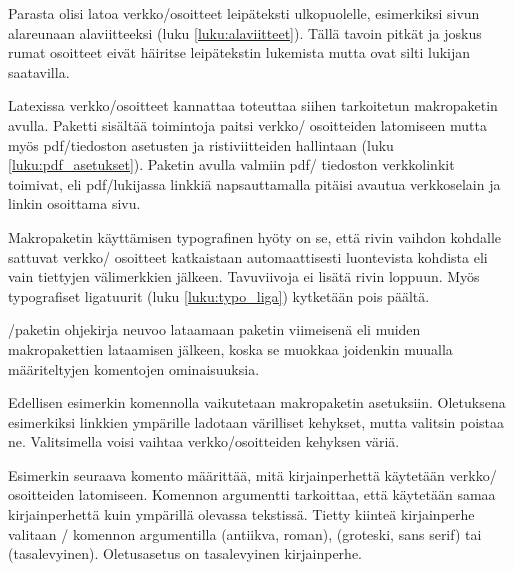 Parasta olisi latoa verkko\-/osoitteet leipäteksti ulkopuolelle,
esimerkiksi sivun alareunaan alaviitteeksi (luku
\ref{luku:alaviitteet}). Tällä tavoin pitkät ja joskus rumat osoitteet
eivät häiritse leipätekstin lukemista mutta ovat silti lukijan
saatavilla.

Latexissa verkko\-/osoitteet kannattaa toteuttaa siihen tarkoitetun
makropaketin avulla. Paketti 
sisältää toimintoja paitsi verkko\-/ osoitteiden latomiseen mutta myös
pdf\-/tiedoston asetusten ja ristiviitteiden hallintaan (luku
\ref{luku:pdf_asetukset}). Paketin avulla valmiin pdf\-/ tiedoston
verkkolinkit toimivat, eli pdf\-/lukijassa linkkiä napsauttamalla
pitäisi avautua verkkoselain ja linkin osoittama sivu.

Makropaketin käyttämisen typografinen hyöty on se, että rivin vaihdon
kohdalle sattuvat verkko\-/ osoitteet katkaistaan automaattisesti
luontevista kohdista eli vain tiettyjen välimerkkien jälkeen.
Tavuviivoja ei lisätä rivin loppuun. Myös typografiset ligatuurit (luku
\ref{luku:typo_liga}) kytketään pois päältä.

\-/paketin ohjekirja neuvoo lataamaan paketin
viimeisenä eli muiden makropakettien lataamisen jälkeen, koska se
muokkaa joidenkin muualla määriteltyjen komentojen ominaisuuksia.

\begin{koodilohkosis}
\usepackage{hyperref}  %
\hypersetup{hidelinks} %
\end{koodilohkosis}

Edellisen esimerkin komennolla  vaikutetaan
makropaketin asetuksiin. Oletuksena esimerkiksi linkkien ympärille
ladotaan värilliset kehykset, mutta valitsin  poistaa
ne. Valitsimella  voisi vaihtaa verkko\-/osoitteiden
kehyksen väriä.

Esimerkin seuraava komento  määrittää, mitä
kirjainperhettä käytetään verkko\-/ osoitteiden latomiseen. Komennon
argumentti  tarkoittaa, että käytetään samaa kirjainperhettä
kuin ympärillä olevassa tekstissä. Tietty kiinteä kirjainperhe valitaan
\-/ komennon argumentilla  (antiikva,
roman),  (groteski, sans serif) tai  (tasalevyinen).
Oletusasetus on tasalevyinen kirjainperhe.

